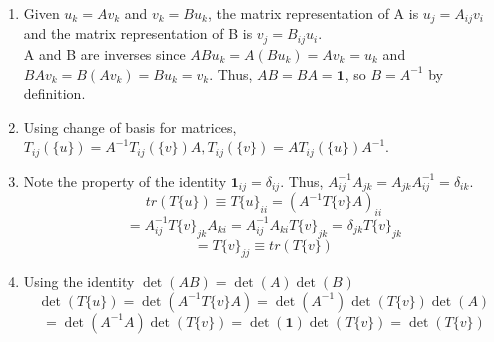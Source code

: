 \begin{sol}
\begin{enumerate}[label=\textbf{(\alph*)}]
\item
Given $u_k=Av_k$ and $v_k=Bu_k$, the matrix representation of A is $u_j=A_{ij} v_i$ and the matrix representation of B is $v_j=B_{ij}u_i$. 
\\A and B are inverses since $ABu_k=A(Bu_k)=Av_k=u_k$ and $BAv_k=B(Av_k)=Bu_k=v_k$. Thus, $AB=BA=\mathbf{1}$, so $B=A^{-1}$ by definition.
\item
Using change of basis for matrices, $T_{ij}(\{u\})=A^{-1}T_{ij}(\{v\})A, T_{ij}(\{v\})=AT_{ij}(\{u\})A^{-1}$.
\item
Note the property of the identity $\mathbf{1}_{ij}=\delta_{ij}$. Thus, $A^{-1}_{ij}A_{jk}=A_{jk}A^{-1}_{ij}=\delta_{ik}$.
$$tr(T\{u\})\equiv T\{u\}_{ii}=(A^{-1}T\{v\}A)_{ii}$$ 
$$=A^{-1}_{ij}T\{v\}_{jk}A_{ki}=A^{-1}_{ij}A_{ki}T\{v\}_{jk}=\delta_{jk}T\{v\}_{jk}$$   
$$=T\{v\}_{jj}\equiv tr(T\{v\})$$  
\item
Using the identity $\det(AB)=\det(A)\det(B)$
$$\det(T\{u\})=\det(A^{-1}T\{v\}A)=\det(A^{-1})\det(T\{v\})\det(A)$$
$$=\det(A^{-1}A)\det(T\{v\})=\det(\mathbf{1})\det(T\{v\})=\det(T\{v\})$$ 

\end{enumerate}
\end{sol}